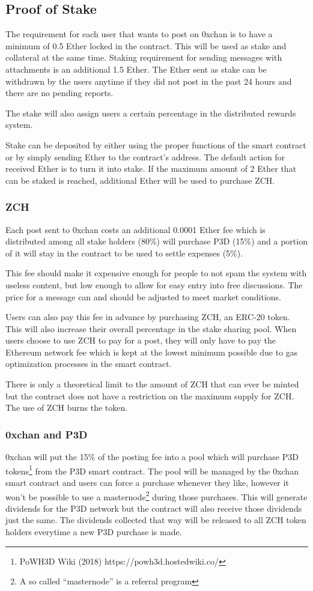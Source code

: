\documentclass[a4paper]{article}
\newcommand{\projectname}{0xchan}
\begin{document}
\subsection{Proof of Stake}
The requirement for each user that wants to post on \projectname{} is to have a minimum of 0.5 Ether locked in the contract. This will be used as stake and collateral at the same time. Staking requirement for sending messages with attachments is an additional 1.5 Ether. The Ether sent as stake can be withdrawn by the users anytime if they did not post in the past 24 hours and there are no pending reports.

The stake will also assign users a certain percentage in the distributed rewards system.

Stake can be deposited by either using the proper functions of the smart contract or by simply sending Ether to the contract's address. The default action for received Ether is to turn it into stake. If the maximum amount of 2 Ether that can be staked is reached, additional Ether will be used to purchase ZCH.

\subsubsection{ZCH}
Each post sent to \projectname{} costs an additional 0.0001 Ether fee which is distributed among all stake holders (80\%) will purchase P3D (15\%) and a portion of it will stay in the contract to be used to settle expenses (5\%).

This fee should make it expensive enough for people to not spam the system with useless content, but low enough to allow for easy entry into free discussions. The price for a message can and should be adjusted to meet market conditions.

Users can also pay this fee in advance by purchasing ZCH, an ERC-20 token. This will also increase their overall percentage in the stake sharing pool. When users choose to use ZCH to pay for a post, they will only have to pay the Ethereum network fee which is kept at the lowest minimum possible due to gas optimization processes in the smart contract.

There is only a theoretical limit to the amount of ZCH that can ever be minted but the contract does not have a restriction on the maximum supply for ZCH. The use of ZCH burns the token.

\subsubsection{\projectname{} and P3D}
\projectname{} will put the 15\% of the posting fee into a pool which will purchase P3D tokens\footnote{PoWH3D Wiki (2018) https://powh3d.hostedwiki.co/} from the P3D smart contract. The pool will be managed by the \projectname{} smart contract and users can force a purchase whenever they like, however it won't be possible to use a masternode\footnote{A so called ``masternode'' is a referral program} during those purchases. This will generate dividends for the P3D network but the contract will also receive those dividends just the same. The dividends collected that way will be released to all ZCH token holders everytime a new P3D purchase is made.
\end{document}
